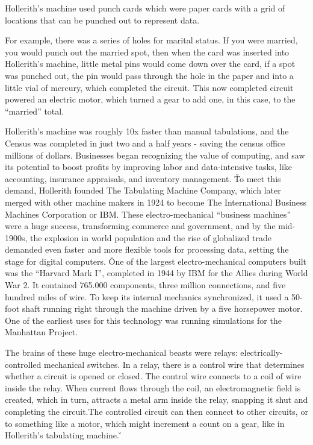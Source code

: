 
Hollerith's machine used punch cards which were paper cards with a grid of locations that can be punched out to
represent data.

\be
For example, there was a series of holes for marital status. If you were married, you would punch out the married
spot, then when the card was inserted into Hollerith's machine, little metal pins would come down over the card, if a
spot was punched out, the pin would pass through the hole in the paper and into a little vial of mercury, which
completed the circuit. This now completed circuit powered an electric motor, which turned a gear to add one, in this
case, to the ``married'' total.
\ee

Hollerith's machine was roughly 10x faster than manual tabulations, and the Census was completed in just two and a
half years - saving the census office millions of dollars. Businesses began recognizing the value of computing, and
saw its potential to boost profits by improving labor and data-intensive tasks, like accounting, insurance
appraisals, and inventory management. \v

To meet this demand, Hollerith founded The Tabulating Machine Company, which later merged with other machine makers
in 1924 to become The International Business Machines Corporation or IBM. These electro-mechanical ``business
machines'' were a huge success, transforming commerce and government, and by the mid-1900s, the explosion in world
population and the rise of globalized trade demanded even faster and more flexible tools for processing data, setting
the stage for digital computers. \v

One of the largest electro-mechanical computers built was the ``Harvard Mark I'', completed in 1944 by IBM for the
Allies during World War 2. It contained 765.000 components, three million connections, and five hundred miles of wire.
To keep its internal mechanics synchronized, it used a 50-foot shaft running right through the machine driven by a
five horsepower motor. One of the earliest uses for this technology was running simulations for the Manhattan Project.


The brains of these huge electro-mechanical beasts were relays: electrically-controlled mechanical switches. In a
relay, there is a control wire that determines whether a circuit is opened or closed. The control wire connects to a
coil of wire inside the relay. When current flows through the coil, an electromagnetic field is created, which in
turn, attracts a metal arm inside the relay, snapping it shut and completing the circuit.The controlled circuit can
then connect to other circuits, or to something like a motor, which might increment a count on a gear, like in
Hollerith's tabulating machine. \v

